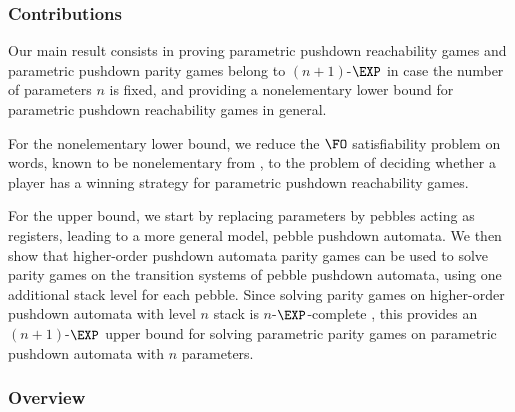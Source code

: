 \documentclass[a4paper,UKenglish,cleveref, autoref, thm-restate]{lipics-v2021}
\begin{document}

\subsubsection*{Contributions}


Our main result consists in
proving parametric pushdown reachability games
and parametric pushdown parity games belong to $(n+1)$-$\EXP$ in case the number of parameters
$n$ is fixed,
and providing a nonelementary lower bound for parametric pushdown reachability games in general.



	For the nonelementary lower bound,
we reduce the $\FO$ satisfiability problem on words, known to be nonelementary
from \cite{Sto74}, to the
problem of deciding whether a player has a winning strategy for parametric pushdown reachability games. 

	For the upper bound, we start by replacing parameters by pebbles acting as registers, leading to a more general model, pebble pushdown automata.
 We then show that higher-order pushdown automata parity games can be used to solve parity games on
 the transition systems of pebble pushdown automata,
using one additional stack level for each pebble.
 Since solving parity games on higher-order pushdown automata with level $n$ stack is $n$-$\EXP$-complete \cite{ Cach03, cachat2007complexity}, this provides an $(n+1)$-$\EXP$ upper bound for solving parametric parity games on parametric pushdown automata with $n$ parameters.



\subsubsection*{Overview}
\end{document}
